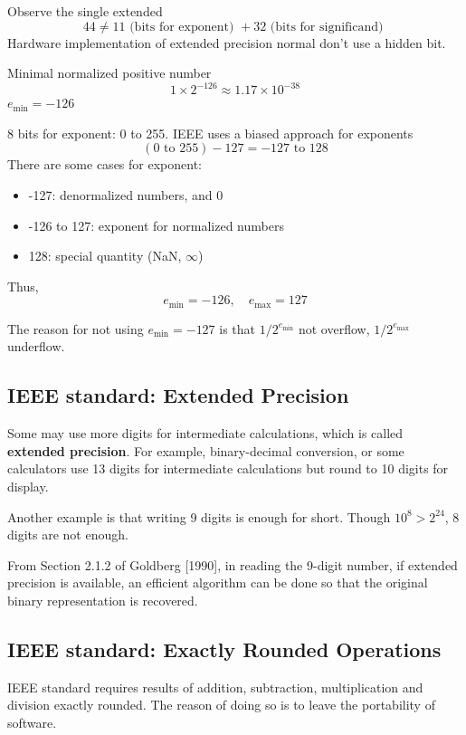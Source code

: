 Observe the single extended \[
    44 \neq 11 \text{ (bits for exponent) } + 32 \text{ (bits for significand) }
\]
Hardware implementation of extended precision normal don't use a hidden bit.


Minimal normalized positive number
\[
    1 \times 2^{-126} \approx 1.17 \times 10^{-38}
\]
\(e_{\min} = -126\)

8 bits for exponent: 0 to 255. IEEE uses a biased
approach for exponents \[
    (0 \text{ to } 255) - 127 = -127 \text{ to } 128
\]
There are some cases for exponent:
\begin{itemize}
    \item -127: denormalized numbers, and 0
    \item -126 to 127: exponent for normalized numbers
    \item 128: special quantity (NaN, $\infty$)
\end{itemize}

Thus, \[
    e_{\min} = -126, \quad e_{\max} = 127
\]

\begin{note}
    The reason for not using $e_{\min} = -127$ is that $1/2^{e_{\min}}$ not overflow, $1/2^{e_{\max}}$ underflow.
\end{note}

\subsection{IEEE standard: Extended Precision}

Some may use more digits for intermediate calculations, which is called \textbf{extended precision}. For example, binary-decimal conversion, or some calculators use 13 digits for intermediate calculations but round to 10 digits for display.

Another example is that writing 9 digits is enough for short. Though $10^8 > 2^{24}$, 8 digits are not enough.


From Section 2.1.2 of Goldberg [1990], in reading
the 9-digit number, if extended precision is
available, an efficient algorithm can be done so that
the original binary representation is recovered.

\subsection{IEEE standard: Exactly Rounded Operations}

IEEE standard requires results of addition, subtraction, multiplication and division exactly rounded. The reason of doing so is to leave the portability of software.
\vspace{0.5em}

